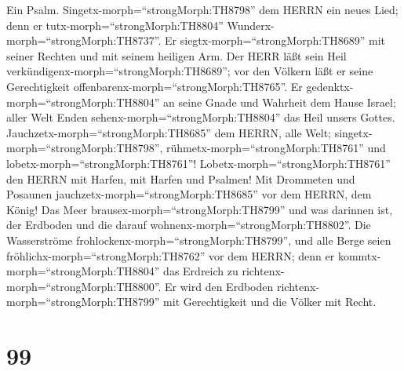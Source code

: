  Ein Psalm. Singetx-morph=``strongMorph:TH8798'' dem HERRN
ein neues Lied; denn er tutx-morph=``strongMorph:TH8804''
Wunderx-morph=``strongMorph:TH8737''. Er
siegtx-morph=``strongMorph:TH8689'' mit seiner Rechten und mit seinem
heiligen Arm.  Der HERR läßt sein Heil
verkündigenx-morph=``strongMorph:TH8689''; vor den Völkern läßt er seine
Gerechtigkeit offenbarenx-morph=``strongMorph:TH8765''.  Er
gedenktx-morph=``strongMorph:TH8804'' an seine Gnade und Wahrheit dem
Hause Israel; aller Welt Enden sehenx-morph=``strongMorph:TH8804'' das
Heil unsers Gottes.  Jauchzetx-morph=``strongMorph:TH8685''
dem HERRN, alle Welt; singetx-morph=``strongMorph:TH8798'',
rühmetx-morph=``strongMorph:TH8761'' und
lobetx-morph=``strongMorph:TH8761''! 
Lobetx-morph=``strongMorph:TH8761'' den HERRN mit Harfen, mit Harfen und
Psalmen!  Mit Drommeten und Posaunen
jauchzetx-morph=``strongMorph:TH8685'' vor dem HERRN, dem König!
 Das Meer brausex-morph=``strongMorph:TH8799'' und was
darinnen ist, der Erdboden und die darauf
wohnenx-morph=``strongMorph:TH8802''.  Die Wasserströme
frohlockenx-morph=``strongMorph:TH8799'', und alle Berge seien
fröhlichx-morph=``strongMorph:TH8762''  vor dem HERRN; denn
er kommtx-morph=``strongMorph:TH8804'' das Erdreich zu
richtenx-morph=``strongMorph:TH8800''. Er wird den Erdboden
richtenx-morph=``strongMorph:TH8799'' mit Gerechtigkeit und die Völker
mit Recht.

\hypertarget{section-98}{%
\section{99}\label{section-98}}

